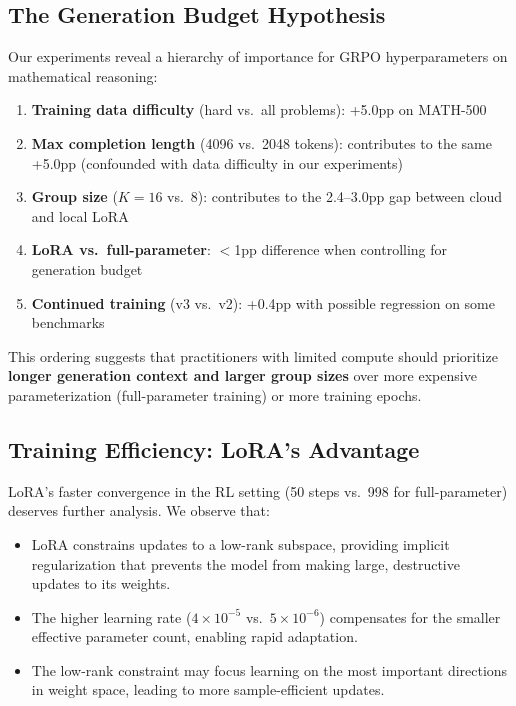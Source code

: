 \documentclass[11pt,a4paper]{article}
\begin{document}
\subsection{The Generation Budget Hypothesis}

Our experiments reveal a hierarchy of importance for GRPO hyperparameters on mathematical reasoning:

\begin{enumerate}[leftmargin=*]
    \item \textbf{Training data difficulty} (hard vs.\ all problems): +5.0pp on MATH-500
    \item \textbf{Max completion length} (4096 vs.\ 2048 tokens): contributes to the same +5.0pp (confounded with data difficulty in our experiments)
    \item \textbf{Group size} ($K=16$ vs.\ 8): contributes to the 2.4--3.0pp gap between cloud and local LoRA
    \item \textbf{LoRA vs.\ full-parameter}: $<$1pp difference when controlling for generation budget
    \item \textbf{Continued training} (v3 vs.\ v2): +0.4pp with possible regression on some benchmarks
\end{enumerate}

This ordering suggests that practitioners with limited compute should prioritize \textbf{longer generation context and larger group sizes} over more expensive parameterization (full-parameter training) or more training epochs.

\subsection{Training Efficiency: LoRA's Advantage}

LoRA's faster convergence in the RL setting (50 steps vs.\ 998 for full-parameter) deserves further analysis. We observe that:

\begin{itemize}[leftmargin=*]
    \item LoRA constrains updates to a low-rank subspace, providing implicit regularization that prevents the model from making large, destructive updates to its weights.
    \item The higher learning rate ($4\times10^{-5}$ vs.\ $5\times10^{-6}$) compensates for the smaller effective parameter count, enabling rapid adaptation.
    \item The low-rank constraint may focus learning on the most important directions in weight space, leading to more sample-efficient updates.
\end{itemize}
\end{document}
